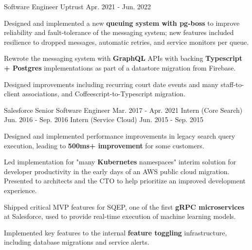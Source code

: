 
\begin{cventries}

  \cventry
    {Software Engineer} %
    {Uptrust} %
    {} %
    {Apr. 2021 - Jun. 2022} %
    {
      \begin{cvitems} %
        \item {Designed and implemented a new \textbf{queuing system with pg-boss} to improve reliability and fault-tolerance of the messaging system; new features included resilience to dropped messages, automatic retries, and service monitors per queue.}
        \item {Rewrote the messaging system with \textbf{GraphQL} APIs with backing \textbf{Typescript + Postgres} implementations as part of a datastore migration from Firebase.}
        \item {Designed improvements including recurring court date events and many staff-to-client associations, and Coffeescript-to-Typescript migration.}
      \end{cvitems}
    }
    
  \cvthreeentry
    {Salesforce} %
    {} %
    {Senior Software Engineer}
    {Mar. 2017 - Apr. 2021}
    {Intern (Core Search)}
    {Jun. 2016 - Sep. 2016}
    {Intern (Service Cloud)}
    {Jun. 2015 - Sep. 2015}
    {
      \begin{cvitems} %
        \item {Designed and implemented performance improvements in legacy search query execution, leading to \textbf{500ms+ improvement} for some customers.}
        \item {Led implementation for "many \textbf{Kubernetes} namespaces" interim solution for developer productivity in the early days of an AWS public cloud migration. Presented to architects and the CTO to help prioritize an improved development experience.}
        \item {Shipped critical MVP features for SQEP, one of the first \textbf{gRPC microservices} at Salesforce, used to provide real-time execution of machine learning models.}
        \item {Implemented key features to the internal \textbf{feature toggling} infrastructure, including database migrations and service alerts.}
      \end{cvitems}
    }
    

\end{cventries}
